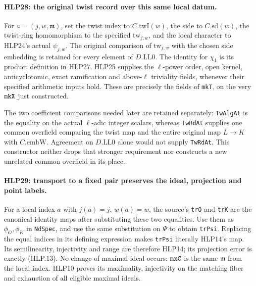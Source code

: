 \paragraph{HLP28: the original twist record over this same local datum.}
\label{claim:HLP28}
For \(a=(j,w,\mathfrak m)\), set the twist index to \(C.\mathrm{twI}(w)\),
the side to \(C.\mathrm{sd}(w)\), the twist-ring homomorphism to the
specified \(\mathrm{tw}_{j,w}\), and the local character to
HLP24's actual \(\psi_{j,w}\). The original comparison of
\(\mathrm{tw}_{j,w}\) with the chosen side embedding is retained
for every element of \(D.\mathrm{LL0}\). The identity for
\(\chi_1\) is its product definition in HLP27. HLP25 supplies the
\(\ell\)-power order, open kernel, anticyclotomic, exact
ramification and above-\(\ell\) triviality fields, whenever their
specified arithmetic inputs hold. These are precisely the fields
of \texttt{mk\allowbreak T}, on the very \(\texttt{mk\allowbreak X}\) just constructed.

The two coefficient comparisons needed later are retained
separately: \texttt{Tw\allowbreak Alg\allowbreak At} is the equality on the actual
\(\ell\)-adic integer scalars, whereas \texttt{Tw\allowbreak Rd\allowbreak At} supplies
one common overfield comparing the twist map and the entire
original map \(L\to K\) with \(C.\mathrm{embW}\). Agreement on
\(D.\mathrm{LL0}\) alone would not supply \texttt{Tw\allowbreak Rd\allowbreak At}.
This constructor neither drops that stronger requirement nor
constructs a new unrelated common overfield in its place.

\paragraph{HLP29: transport to a fixed pair preserves the ideal, projection and point labels.}
\label{claim:HLP29}
For a local index \(a\) with \(j(a)=j\), \(w(a)=w\), the source's
\texttt{tr\allowbreak O} and \texttt{tr\allowbreak K} are the canonical identity maps
after substituting these two equalities. Use them as
\(\phi_O,\phi_K\) in \texttt{Nd\allowbreak Spec}, and use the same substitution
on \(\Psi\) to obtain \texttt{tr\allowbreak Psi}. Replacing the equal indices
in its defining expression makes \texttt{tr\allowbreak Psi} literally HLP14's
map. Its semilinearity, injectivity and range are therefore HLP14;
its projection error is exactly (HLP.13). No change of maximal
ideal occurs: \(\texttt{mx\allowbreak C}\) is the same \(\mathfrak m\) from
the local index. HLP10 proves its maximality, injectivity on the
matching fiber and exhaustion of all eligible maximal ideals.

